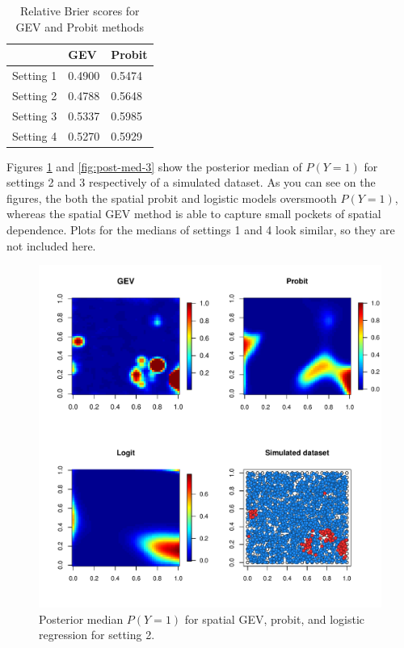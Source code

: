 \documentclass[11pt]{article}
\begin{document}
\begin{table}
  \caption{Relative Brier scores for GEV and Probit methods}
  \label{tbl:simresults}
  \centering
  \begin{tabular}{r|ll}
    \cline{2-3}
              & GEV    & Probit\\
    \hline
    Setting 1 & 0.4900 & 0.5474\\
    Setting 2 & 0.4788 & 0.5648\\
    Setting 3 & 0.5337 & 0.5985\\
    Setting 4 & 0.5270 & 0.5929\\
    \hline
  \end{tabular}
\end{table}

Figures \ref{fig:post-med-2} and \ref{fig:post-med-3} show the posterior median of $P(Y =1)$ for settings 2 and 3 respectively of a simulated dataset.
As you can see on the figures, the both the spatial probit and logistic models oversmooth $P(Y = 1)$, whereas the spatial GEV method is able to capture small pockets of spatial dependence.
Plots for the medians of settings 1 and 4 look similar, so they are not included here.

\begin{figure}
  \includegraphics[width=\linewidth]{plots/post-med-2.pdf}
  \caption{Posterior median $P(Y = 1)$ for spatial GEV, probit, and logistic regression for setting 2.}
  \label{fig:post-med-2}
\end{figure}
\end{document}
